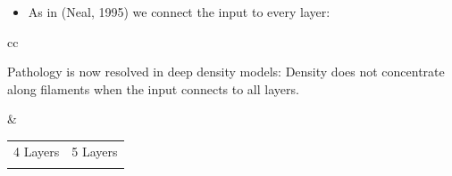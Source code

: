 \documentclass[portrait,a0b,final,a4resizeable]{include/a0poster}
\def\jointspacing{\vspace{0.3in}}
\begin{document}
\begin{poster}
\begin{multicols}{2}
\jointspacing
\jointspacing

\centering
\begin{itemize}
	\item As in  {\color{mydarkblue} (Neal, 1995)} we connect the input to every layer:
\end{itemize}

\jointspacing


\jointspacing

\newcommand{\gpdrawboxcon}[1]{
\setlength\fboxsep{0pt}
\hspace{-0.4in} 
\fbox{
\texttt{[image: ../../figures/connected\_deep\_sample\_seed\_0/deep\_sample\_connected\_layer\#1]}
}}

\begin{tabular}{cc}
\begin{minipage}[c]{0.4\columnwidth}
Pathology is now resolved in deep density models:
Density does not concentrate along filaments when the input connects to all layers.
\end{minipage}
&
\begin{minipage}[c]{0.45\columnwidth}
\centering
\begin{tabular}{cc}
 4 Layers & 5 Layers \\
\gpdrawboxcon{4} &
\gpdrawboxcon{5}
\end{tabular}
\end{minipage}
\end{tabular}

\jointspacing
\jointspacing

\vspace{0.3in}


\end{multicols}
\end{poster}
\end{document}
